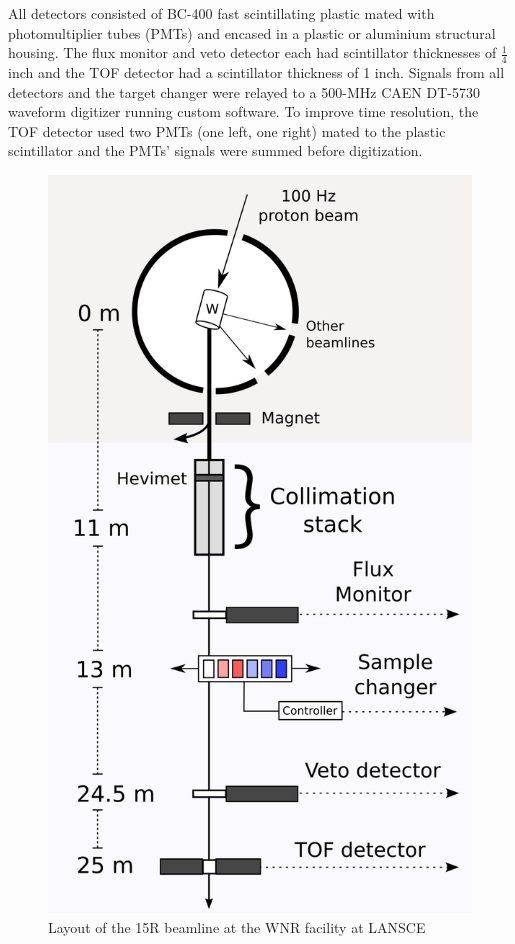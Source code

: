 All detectors consisted of BC-400 fast scintillating plastic mated with 
photomultiplier tubes (PMTs) and encased in a plastic or
aluminium structural housing. The flux monitor and veto detector each had
scintillator thicknesses of $\frac{1}{4}$ inch and the TOF detector had a
scintillator thickness of 1 inch. Signals from all detectors and
the target changer were relayed to a 500-MHz CAEN DT-5730 waveform digitizer
running custom software. To improve time resolution, the TOF detector used two
PMTs (one left, one right) mated to the plastic scintillator and the PMTs' signals were 
summed before digitization.

\begin{figure}
    \includegraphics[scale=0.6]{figures/ExperimentalSetup.png}
    \caption{Layout of the 15R beamline at the WNR facility at LANSCE}
    \label{ExperimentalApparatus}
\end{figure}

